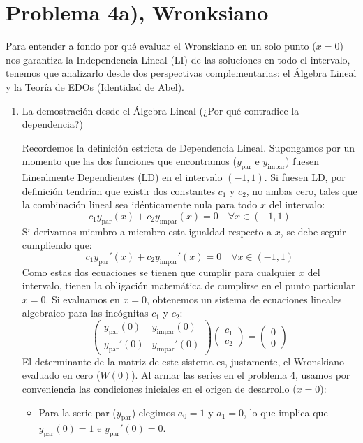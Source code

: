 \documentclass[11pt,spanish]{article}
\newcounter{problema}
\begin{document}
\section{Problema 4a), Wronksiano}

Para entender a fondo por qué evaluar el Wronskiano en un solo punto ($x=0$) nos garantiza la Independencia Lineal (LI) de las soluciones en todo el intervalo, tenemos que analizarlo desde dos perspectivas complementarias: el Álgebra Lineal y la Teoría de EDOs (Identidad de Abel).

\begin{enumerate}
\item La demostración desde el Álgebra Lineal (¿Por qué contradice la dependencia?)

Recordemos la definición estricta de Dependencia Lineal. Supongamos por un momento que las dos funciones que encontramos ($y_{\text{par}}$ e $y_{\text{impar}}$) fuesen Linealmente Dependientes (LD) en el intervalo $(-1,1)$.
Si fuesen LD, por definición tendrían que existir dos constantes $c_1$ y $c_2$, no ambas cero, tales que la combinación lineal sea idénticamente nula para todo $x$ del intervalo:
$$c_1 y_{\text{par}}(x) + c_2 y_{\text{impar}}(x) = 0 \quad \forall x \in (-1,1)$$
Si derivamos miembro a miembro esta igualdad respecto a $x$, se debe seguir cumpliendo que:
$$c_1 y_{\text{par}}'(x) + c_2 y_{\text{impar}}'(x) = 0 \quad \forall x \in (-1,1)$$
Como estas dos ecuaciones se tienen que cumplir para cualquier $x$ del intervalo, tienen la obligación matemática de cumplirse en el punto particular $x = 0$. Si evaluamos en $x = 0$, obtenemos un sistema de ecuaciones lineales algebraico para las incógnitas $c_1$ y $c_2$:
$$\begin{pmatrix} y_{\text{par}}(0) & y_{\text{impar}}(0) \\ y_{\text{par}}'(0) & y_{\text{impar}}'(0) \end{pmatrix} \begin{pmatrix} c_1 \\ c_2 \end{pmatrix} = \begin{pmatrix} 0 \\ 0 \end{pmatrix}$$
El determinante de la matriz de este sistema es, justamente, el Wronskiano evaluado en cero ($W(0)$).
Al armar las series en el problema 4, usamos por conveniencia las condiciones iniciales en el origen de desarrollo ($x=0$):
\begin{itemize}
\item Para la serie par ($y_{\text{par}}$) elegimos $a_0=1$ y $a_1=0$, lo que implica que $y_{\text{par}}(0) = 1$ e $y_{\text{par}}'(0) = 0$.

\end{itemize}
\end{enumerate}
\end{document}
